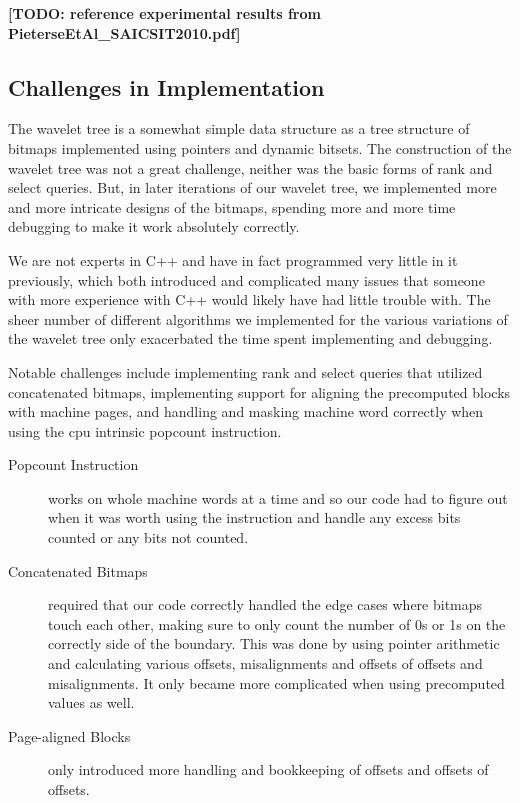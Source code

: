 \textbf{[TODO: reference experimental results from PieterseEtAl\_SAICSIT2010.pdf]}

\subsection{Challenges in Implementation}
The wavelet tree is a somewhat simple data structure as a tree structure of bitmaps implemented using pointers and dynamic bitsets.
The construction of the wavelet tree was not a great challenge, neither was the basic forms of rank and select queries.
But, in later iterations of our wavelet tree, we implemented more and more intricate designs of the bitmaps, spending more and more time debugging to make it work absolutely correctly.

We are not experts in C++ and have in fact programmed very little in it previously, which both introduced and complicated many issues that someone with more experience with C++ would likely have had little trouble with.
The sheer number of different algorithms we implemented for the various variations of the wavelet tree only exacerbated the time spent implementing and debugging.

Notable challenges include implementing rank and select queries that utilized concatenated bitmaps, implementing support for aligning the precomputed blocks with machine pages, and handling and masking machine word correctly when using the cpu intrinsic popcount instruction.


\begin{description}
\item[Popcount Instruction] works on whole machine words at a time and so our code had to figure out when it was worth using the instruction and handle any excess bits counted or any bits not counted.
\item[Concatenated Bitmaps] required that our code correctly handled the edge cases where bitmaps touch each other, making sure to only count the number of 0s or 1s on the correctly side of the boundary.
This was done by using pointer arithmetic and calculating various offsets, misalignments and offsets of offsets and misalignments.
It only became more complicated when using precomputed values as well.
\item[Page-aligned Blocks] only introduced more handling and bookkeeping of offsets and offsets of offsets.
\end{description}
